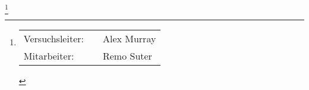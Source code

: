 \newcommand\blfootnote[1]{%
    \begingroup
    \renewcommand\thefootnote{}\footnote{#1}%
    \addtocounter{footnote}{-1}%
    \endgroup
}

\begin{titlepage}
    \maketitle
    \blfootnote{%
        \large
        \begin{tabular}{lcl}
            Versuchsleiter: & \hspace{5mm} & Alex Murray \\
            Mitarbeiter:    &              & Remo Suter \\
        \end{tabular}
    }
\end{titlepage}


